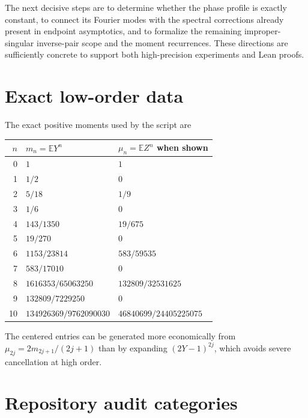 \documentclass[11pt,oneside]{article}
\theoremstyle{definition}
\theoremstyle{remark}
\newcommand{\E}{\mathbb E}
\newcommand{\1}{\mathbf 1}
\begin{document}
The next decisive steps are to determine whether the phase profile is exactly constant,
to connect its Fourier modes with the spectral corrections already present in endpoint
asymptotics, and to formalize the remaining improper-singular inverse-pair scope and the
moment recurrences.  These directions
are sufficiently concrete to support both high-precision experiments and Lean proofs.

\appendix

\section{Exact low-order data}

The exact positive moments used by the script are
\begin{longtable}{@{}rll@{}}
\toprule
\(n\)&\(m_n=\E Y^n\)&\(\mu_n=\E Z^n\) when shown\\
\midrule
0&\(1\)&\(1\)\\
1&\(1/2\)&\(0\)\\
2&\(5/18\)&\(1/9\)\\
3&\(1/6\)&\(0\)\\
4&\(143/1350\)&\(19/675\)\\
5&\(19/270\)&\(0\)\\
6&\(1153/23814\)&\(583/59535\)\\
7&\(583/17010\)&\(0\)\\
8&\(1616353/65063250\)&\(132809/32531625\)\\
9&\(132809/7229250\)&\(0\)\\
10&\(134926369/9762090030\)&\(46840699/24405225075\)\\
\bottomrule
\end{longtable}
The centered entries can be generated more economically from
\(\mu_{2j}=2m_{2j+1}/(2j+1)\) than by expanding \((2Y-1)^{2j}\), which avoids severe
cancellation at high order.

\section{Repository audit categories}
\end{document}
